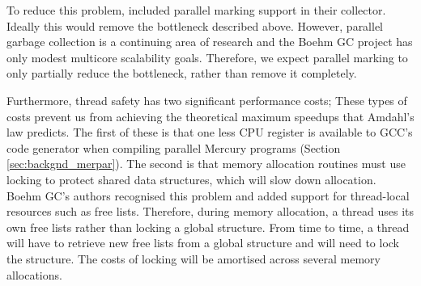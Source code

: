 To reduce this problem,
\citet{boehm-gc} included parallel marking support in their collector.
Ideally this would remove the bottleneck described above.
However,
parallel garbage collection is a continuing area of research and
the Boehm GC project has only modest multicore scalability goals.
Therefore,
we expect parallel marking to only partially reduce the bottleneck,
rather than remove it completely.

Furthermore, thread safety has two significant performance costs;
These types of costs prevent us from achieving the theoretical maximum
speedups that Amdahl's law predicts.
The first of these is that
one less CPU register is available to GCC's code generator when compiling
parallel Mercury programs (Section \ref{sec:backgnd_merpar}).
The second is that
memory allocation routines must use locking to protect shared data
structures,
which will slow down allocation.
Boehm GC's authors recognised this problem and
added support for thread-local resources such as free lists.
Therefore,
during memory allocation,
a thread uses its own free lists rather than locking a global structure.
From time to time, a thread will have to retrieve new free lists
from a global structure and will need to lock the structure.
The costs of locking will be amortised across several memory allocations.

